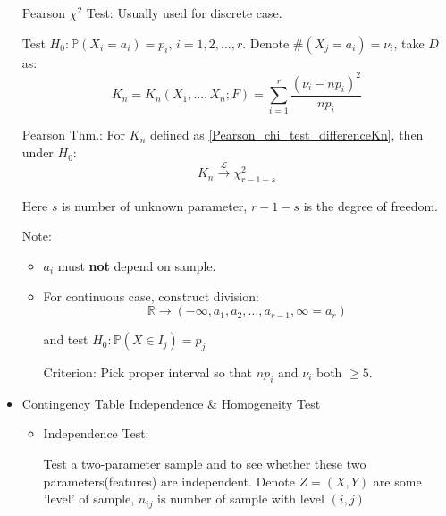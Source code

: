\begin{itemize}
            Pearson $\chi^2$ Test: Usually used for discrete case. 
            
            Test $H_0:\mathbb{P}(X_i=a_i)=p_i,\, i=1,2,\ldots,r$. Denote $\#(X_j=a_i)=\nu_i$, take $D$ as:
            \begin{equation}\label{Pearson_chi_test_differenceKn}
                K_n=K_n(X_1,\ldots,X_n;F)=\sum_{i=1}^r\frac{(\nu_i-np_i)^2}{np_i}
            \end{equation}

            Pearson Thm.: For $K_n$ defined as \autoref{Pearson_chi_test_differenceKn}, then under $H_0$:
            \begin{equation}
                K_n\xrightarrow[]{\mathscr{L}}\chi^2_{r-1-s}
            \end{equation} 

            Here $s$ is number of unknown parameter, $r-1-s$ is the degree of freedom.

            Note:
            \begin{itemize}
                \item $a_i$ must \textbf{not} depend on sample.
                \item For continuous case, construct division:
                \begin{equation}\mathbb{R}\rightarrow(-\infty,a_1,a_2,\ldots,a_{r-1},\infty=a_r) \end{equation}

                and test $H_0:\mathbb{P}(X\in I_j)=p_j$

                Criterion: Pick proper interval so that $np_i$ and $\nu_i$ both $\geq 5$.
            \end{itemize}
 


        \item Contingency Table Independence \& Homogeneity Test
 
\begin{itemize}
    \item Independence Test:
    
    Test a two-parameter sample and to see whether these two parameters(features) are independent. Denote $Z=(X,Y)$ are some 'level' of sample, $n_{ij}$ is number of sample with level $(i,j)$


\end{itemize}
\end{itemize}
